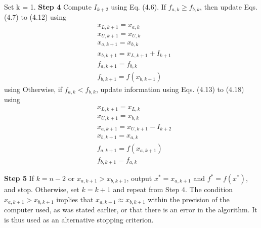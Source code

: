 \begin{multicols}{3}
Set k = 1. \newline
\textbf{Step 4} \newline
Compute $I_{k+2}$ using Eq. (4.6).
If $f_{a,k} \geq f_{b,k}$, then update Eqs. (4.7) to (4.12) using
\begin{align*}
& x_{L,k+1}=x_{a,k} \\
& x_{U,k+1}=x_{U,k} \\
& x_{a,k+1}=x_{b,k} \\
& x_{b,k+1}=x_{L,k+1}+I_{k+1} \\
& f_{a,k+1}=f_{b,k} \\
& f_{b,k+1}=f(x_{b,k+1})
\end{align*}
using  Otherwise, if $f_{a,k} < f_{b,k}$, update
information using Eqs. (4.13) to (4.18) using \newline
\begin{align*}
& x_{L,k+1}=x_{L,k} \\
& x_{U,k+1}=x_{b,k} \\
& x_{a,k+1}=x_{U,k+1}-I_{k+2} \\
& x_{b,k+1}=x_{a,k} \\
& f_{a,k+1}=f(x_{a,k+1}) \\
& f_{b,k+1}=f_{a,k}
\end{align*}

\textbf{Step 5} \newline
If $k = n - 2$ or $x_{a,k+1} > x_{b,k+1}$, output $x^* = x_{a,k+1}$ and $f^* = f(x^*)$,
and stop. Otherwise, set $k = k + 1$ and repeat from Step 4.
The condition $x_{a,k+1} > x_{b,k+1}$ implies that $x_{a,k+1} \approx x_{b,k+1}$ within the precision of the computer used, as was stated earlier, or that there is an error in the algorithm. It is thus used as an alternative stopping criterion. \newline


\end{multicols}
